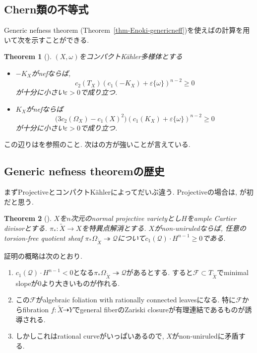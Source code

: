 \documentclass[dvipdfmx,a4paper,11pt]{article} %
\newtheorem{thm}{Theorem}[section]
\theoremstyle{definition}
\theoremstyle{remark}
\numberwithin{equation}{section}
\begin{document}
 \subsection{Chern類の不等式}
Generic nefness theorem (Theorem~\ref{thm-Enoki-genericneff})を使えば\cite{Miy87}の計算を用いて次を示すことができる. 
\begin{thm}[{\cite{Miy87, Cao13, Ou23, IM22, IMM24}}]
$(X, \omega)$をコンパクトK\"ahler多様体とする
\begin{itemize}
\item \(-K_X\)がnefならば, 
\[
c_2(T_X) (c_1(-K_X) + \varepsilon\{ \omega\})^{n-2}\geq 0
\]
が十分に小さい$\varepsilon >0$で成り立つ. 
\item \(K_X\)がnefならば
\[
\bigl(3c_2(\Omega_X)-c_1(X)^2\bigr)(c_1(K_X) + \varepsilon \{\omega\})^{n-2} \geq 0
\]
が十分に小さい$\varepsilon >0$で成り立つ. 
\end{itemize}
\end{thm}
 この辺りは\cite[Subsection 6.2, 6.3]{Iwa-Chern}を参照のこと. 
 次は\cite[Subsection 6.2, 6.3]{Iwa-Chern}の方が強いことが言えている. 

 
 \subsection{Generic nefness theoremの歴史}
まずProjectiveとコンパクトK\"ahlerによってだいぶ違う. 
Projectiveの場合は, \cite{Miy87}が初だと思う. 
\begin{thm}[{\cite[Corollary 6.4]{Miy87}}]
$X$を$n$次元のnormal projective varietyとし$H$をample Cartier divisorとする. $\pi_{*} \colon \widetilde{X} \to X$を特異点解消とする.
$X$がnon-uniruledならば, 任意のtorsion-free quotient sheaf $\pi_{*}\Omega_{\widetilde{X}} \twoheadrightarrow \mathcal{Q}$について$c_1(\mathcal{Q})\cdot H^{n-1} \geq 0$である.
\end{thm}
証明の概略は次のとおり. 
\begin{enumerate}
\item $c_1(\mathcal{Q})\cdot H^{n-1} <0$となる$\pi_{*}\Omega_{\widetilde{X}} \twoheadrightarrow \mathcal{Q}$があるとする. すると$\mathcal{F} \subset T_{\widetilde{X}}$でminimal slopeが0より大きいものが作れる. 
\item この$\mathcal{F}$がalgebraic foliation with rationally connected leavesになる. 特に$\mathcal{F}$からfibration $f \colon \widetilde{X} \dashrightarrow Y$でgeneral fiberのZariski closureが有理連結であるものが誘導される. 
\item しかしこれはrational curveがいっぱいあるので, $X$がnon-uniruledに矛盾する. 
\end{enumerate}
\end{document}

